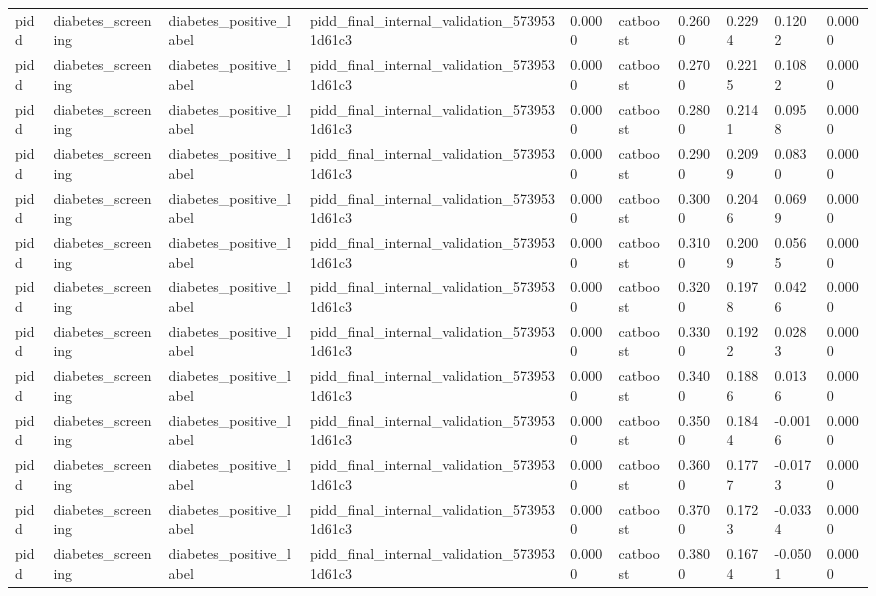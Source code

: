 \begin{tabular}{llllllllll}
pidd & diabetes\_screening & diabetes\_positive\_label & pidd\_final\_internal\_validation\_5739531d61c3 & 0.0000 & catboost & 0.2600 & 0.2294 & 0.1202 & 0.0000 \\
pidd & diabetes\_screening & diabetes\_positive\_label & pidd\_final\_internal\_validation\_5739531d61c3 & 0.0000 & catboost & 0.2700 & 0.2215 & 0.1082 & 0.0000 \\
pidd & diabetes\_screening & diabetes\_positive\_label & pidd\_final\_internal\_validation\_5739531d61c3 & 0.0000 & catboost & 0.2800 & 0.2141 & 0.0958 & 0.0000 \\
pidd & diabetes\_screening & diabetes\_positive\_label & pidd\_final\_internal\_validation\_5739531d61c3 & 0.0000 & catboost & 0.2900 & 0.2099 & 0.0830 & 0.0000 \\
pidd & diabetes\_screening & diabetes\_positive\_label & pidd\_final\_internal\_validation\_5739531d61c3 & 0.0000 & catboost & 0.3000 & 0.2046 & 0.0699 & 0.0000 \\
pidd & diabetes\_screening & diabetes\_positive\_label & pidd\_final\_internal\_validation\_5739531d61c3 & 0.0000 & catboost & 0.3100 & 0.2009 & 0.0565 & 0.0000 \\
pidd & diabetes\_screening & diabetes\_positive\_label & pidd\_final\_internal\_validation\_5739531d61c3 & 0.0000 & catboost & 0.3200 & 0.1978 & 0.0426 & 0.0000 \\
pidd & diabetes\_screening & diabetes\_positive\_label & pidd\_final\_internal\_validation\_5739531d61c3 & 0.0000 & catboost & 0.3300 & 0.1922 & 0.0283 & 0.0000 \\
pidd & diabetes\_screening & diabetes\_positive\_label & pidd\_final\_internal\_validation\_5739531d61c3 & 0.0000 & catboost & 0.3400 & 0.1886 & 0.0136 & 0.0000 \\
pidd & diabetes\_screening & diabetes\_positive\_label & pidd\_final\_internal\_validation\_5739531d61c3 & 0.0000 & catboost & 0.3500 & 0.1844 & -0.0016 & 0.0000 \\
pidd & diabetes\_screening & diabetes\_positive\_label & pidd\_final\_internal\_validation\_5739531d61c3 & 0.0000 & catboost & 0.3600 & 0.1777 & -0.0173 & 0.0000 \\
pidd & diabetes\_screening & diabetes\_positive\_label & pidd\_final\_internal\_validation\_5739531d61c3 & 0.0000 & catboost & 0.3700 & 0.1723 & -0.0334 & 0.0000 \\
pidd & diabetes\_screening & diabetes\_positive\_label & pidd\_final\_internal\_validation\_5739531d61c3 & 0.0000 & catboost & 0.3800 & 0.1674 & -0.0501 & 0.0000 \\

\end{tabular}
